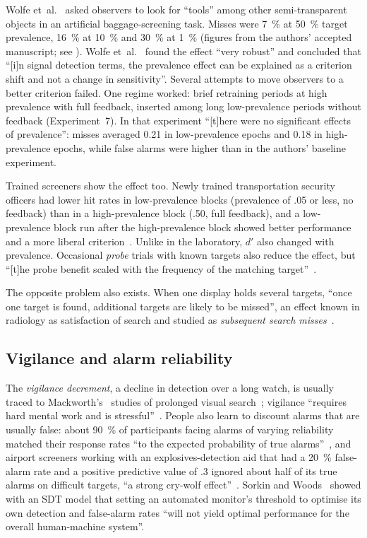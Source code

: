 \documentclass[11pt]{article}
\begin{document}
Wolfe et~al.~\cite{wolfe2005} asked observers to look for ``tools'' among other semi-transparent objects in an artificial baggage-screening task. Misses were \SI{7}{\percent} at \SI{50}{\percent} target prevalence, \SI{16}{\percent} at \SI{10}{\percent} and \SI{30}{\percent} at \SI{1}{\percent} (figures from the authors' accepted manuscript; see ). Wolfe et~al.~\cite[Abstract]{wolfe2007} found the effect ``very robust'' and concluded that ``[i]n signal detection terms, the prevalence effect can be explained as a criterion shift and not a change in sensitivity''. Several attempts to move observers to a better criterion failed. One regime worked: brief retraining periods at high prevalence with full feedback, inserted among long low-prevalence periods without feedback (Experiment~7). In that experiment ``[t]here were no significant effects of prevalence'': misses averaged 0.21 in low-prevalence epochs and 0.18 in high-prevalence epochs, while false alarms were higher than in the authors' baseline experiment.

Trained screeners show the effect too. Newly trained transportation security officers had lower hit rates in low-prevalence blocks (prevalence of .05 or less, no feedback) than in a high-prevalence block (.50, full feedback), and a low-prevalence block run after the high-prevalence block showed better performance and a more liberal criterion~\cite{wolfe2013}. Unlike in the laboratory, $d'$ also changed with prevalence. Occasional \emph{probe} trials with known targets also reduce the effect, but ``[t]he probe benefit scaled with the frequency of the matching target''~\cite[Abstract]{becker2026}.

The opposite problem also exists. When one display holds several targets, ``once one target is found, additional targets are likely to be missed'', an effect known in radiology as satisfaction of search and studied as \emph{subsequent search misses}~\cite[Abstract]{cain2013}.

\subsection{Vigilance and alarm reliability}\label{sec:vigilance}

The \emph{vigilance decrement}, a decline in detection over a long watch, is usually traced to Mackworth's~\cite{mackworth1948} studies of prolonged visual search~\cite{klein2025}; vigilance ``requires hard mental work and is stressful''~\cite{warm2008}. People also learn to discount alarms that are usually false: about \SI{90}{\percent} of participants facing alarms of varying reliability matched their response rates ``to the expected probability of true alarms''~\cite{bliss1995}, and airport screeners working with an explosives-detection aid that had a \SI{20}{\percent} false-alarm rate and a positive predictive value of .3 ignored about half of its true alarms on difficult targets, ``a strong cry-wolf effect''~\cite{huegli2020}. Sorkin and Woods~\cite{sorkin1985} showed with an SDT model that setting an automated monitor's threshold to optimise its own detection and false-alarm rates ``will not yield optimal performance for the overall human-machine system''.
\end{document}
